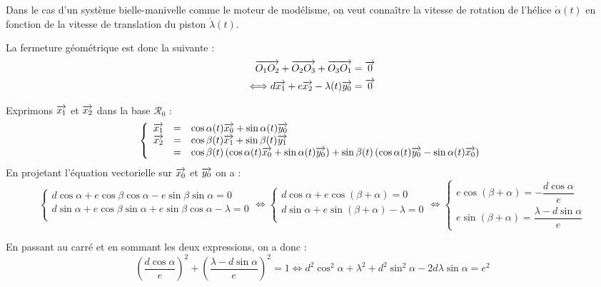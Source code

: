\documentclass[10pt,oneside]{article}
\begin{document}
\begin{exemple}


Dans le cas d'un système bielle-manivelle comme le moteur de modélisme, on veut connaître la vitesse de rotation de l'hélice $\dot{\alpha}(t)$ en fonction de la vitesse de translation du piston $\dot{\lambda}(t)$. 

La fermeture géométrique est donc la suivante : 
\begin{eqnarray*}
\overrightarrow{O_1 O_2} + \overrightarrow{O_2 O_3} +\overrightarrow{O_3 O_1} = \overrightarrow{0} \\
\Longleftrightarrow d\overrightarrow{x_1} + e \overrightarrow{x_2} - \lambda(t) \overrightarrow{y_0}  = \overrightarrow{0}
\end{eqnarray*}

Exprimons $\overrightarrow{x_1}$ et $\overrightarrow{x_2}$ dans la base $\mathcal{R}_0$ :
$$
\left\{
\begin{array}{lcl}
\overrightarrow{x_1} & = & \cos \alpha(t) \overrightarrow{x_0} + \sin \alpha(t) \overrightarrow{y_0} \\
\overrightarrow{x_2} & = & \cos \beta(t) \overrightarrow{x_1} + \sin \beta(t) \overrightarrow{y_1} \\
 & = & \cos \beta(t) \left( \cos \alpha(t) \overrightarrow{x_0} + \sin \alpha(t) \overrightarrow{y_0} \right) + 
\sin \beta(t) \left( \cos \alpha(t) \overrightarrow{y_0} - \sin \alpha(t) \overrightarrow{x_0} \right) \\
\end{array}
\right.
$$
En projetant l'équation vectorielle sur $\overrightarrow{x_0}$ et $\overrightarrow{y_0}$ on a : 
$$
\left\{
\begin{array}{l}
d\cos\alpha + e \cos\beta \cos\alpha - e \sin\beta \sin\alpha = 0 \\
d\sin\alpha +  e \cos\beta \sin\alpha + e \sin\beta \cos\alpha- \lambda= 0 \\
\end{array}
\right.
\Longleftrightarrow 
\left\{
\begin{array}{l}
d\cos\alpha+ e \cos\left(\beta +\alpha\right)  = 0 \\
d\sin\alpha +  e \sin\left(\beta +\alpha\right) - \lambda= 0 \\
\end{array}
\right.
\Longleftrightarrow 
\left\{
\begin{array}{l}
e \cos\left(\beta +\alpha\right)  = - \dfrac{d\cos\alpha}{e} \\
e \sin\left(\beta +\alpha\right) =  \dfrac{\lambda - d\sin\alpha}{e}
\end{array}
\right.
$$

En passant au carré et en sommant les deux expressions, on a donc : 
$$
\left(\dfrac{d\cos\alpha}{e}\right)^2 + \left(\dfrac{\lambda - d\sin\alpha}{e}\right)^2 = 1 
\Longleftrightarrow
d^2\cos^2\alpha + \lambda^2 + d^2\sin^2\alpha -2d\lambda\sin\alpha = e^2
$$


\end{exemple}
\end{document}
